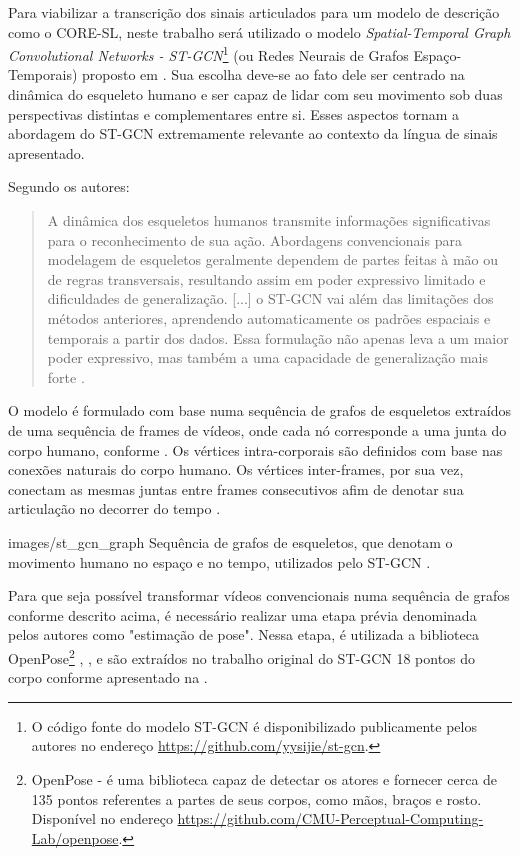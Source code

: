 Para viabilizar a transcrição dos sinais articulados para um modelo de descrição como o CORE-SL, neste trabalho será utilizado o modelo \textit{Spatial-Temporal Graph Convolutional Networks - ST-GCN}\footnote{
    O código fonte do modelo ST-GCN é disponibilizado publicamente pelos autores no endereço \url{https://github.com/yysijie/st-gcn}.
} (ou Redes Neurais de Grafos Espaço-Temporais) proposto em \cite{st-gcn-2018}. Sua escolha deve-se ao fato dele ser centrado na dinâmica do esqueleto humano e ser capaz de lidar com seu movimento sob duas perspectivas distintas e complementares entre si. Esses aspectos tornam a abordagem do ST-GCN extremamente relevante ao contexto da língua de sinais apresentado.

Segundo os autores:
\begin{quote}
A dinâmica dos esqueletos humanos transmite informações significativas para o reconhecimento de sua ação. Abordagens convencionais para modelagem de esqueletos geralmente dependem de partes feitas à mão ou de regras transversais, resultando assim em poder expressivo limitado e dificuldades de generalização. [...] o ST-GCN vai além das limitações dos métodos anteriores, aprendendo automaticamente os padrões espaciais e temporais a partir dos dados. Essa formulação não apenas leva a um maior poder expressivo, mas também a uma capacidade de generalização mais forte \cite{st-gcn-2018}.
\end{quote}

O modelo é formulado com base numa sequência de grafos de esqueletos extraídos de uma sequência de frames de vídeos, onde cada nó corresponde a uma junta do corpo humano, conforme . Os vértices intra-corporais são definidos com base nas conexões naturais do corpo humano. Os vértices inter-frames, por sua vez, conectam as mesmas juntas entre frames consecutivos afim de denotar sua articulação no decorrer do tempo \cite{st-gcn-2018}.

    {images/st_gcn_graph}
    {Sequência de grafos de esqueletos, que denotam o movimento humano no espaço e no tempo, utilizados pelo ST-GCN \cite{st-gcn-2018}.}

Para que seja possível transformar vídeos convencionais numa sequência de grafos conforme descrito acima, é necessário realizar uma etapa prévia denominada pelos autores como "estimação de pose". Nessa etapa, é utilizada a biblioteca OpenPose\footnote{
	OpenPose - é uma biblioteca capaz de detectar os atores e fornecer cerca de 135 pontos referentes a partes de seus corpos, como mãos, braços e rosto. Disponível no endereço \url{https://github.com/CMU-Perceptual-Computing-Lab/openpose}.
} \cite{cao-realtime-2017}, \cite{simon-hand-2017}, \cite{wei-cpm-2016} e são extraídos no trabalho original do ST-GCN 18 pontos do corpo conforme apresentado na .

